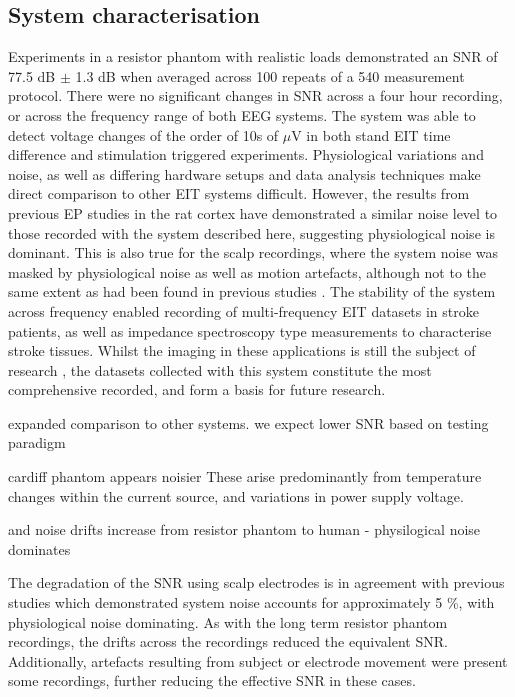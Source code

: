 \subsection{System characterisation}
Experiments in a resistor phantom with realistic loads demonstrated an SNR of 77.5 dB $\pm$ 1.3 dB when averaged across 100 repeats of a 540 measurement protocol. There were no significant changes in SNR across a four hour recording, or across the frequency range of both EEG systems. The system was able to detect voltage changes of the order of 10s of $\mu$V in both stand EIT time difference and stimulation triggered experiments. Physiological variations and noise, as well as differing hardware setups and data analysis techniques make direct comparison to other EIT systems difficult. However, the results from previous EP studies \cite{Oh2011} in the rat cortex have demonstrated a similar noise level to those recorded with the system described here, suggesting physiological noise is dominant. This is also true for the scalp recordings, where the system noise was masked by physiological noise as well as motion artefacts, although not to the same extent as had been found in previous studies \cite{Fabrizi_2006}. The stability of the system across frequency enabled recording of multi-frequency EIT datasets in stroke patients, as well as impedance spectroscopy type measurements to characterise stroke tissues. Whilst the imaging in these applications is still the subject of research \cite{malone2015} \cite{jang2015detection}, the datasets collected with this system constitute the most comprehensive recorded, and form a basis for future research. 


expanded comparison to other systems. we expect lower SNR based on testing paradigm

cardiff phantom appears noisier
These arise predominantly from temperature changes within the current source, and variations in power supply voltage.

and noise drifts increase from resistor phantom to human - physilogical noise dominates


 The degradation of the SNR using scalp electrodes is in agreement with previous studies \cite{fabrizi2007analysis} which demonstrated system noise accounts for approximately 5 \%, with physiological noise dominating. As with the long term resistor phantom recordings, the drifts across the recordings reduced the equivalent SNR. Additionally, artefacts resulting from subject or electrode movement were present some recordings, further reducing the effective SNR in these cases.  



